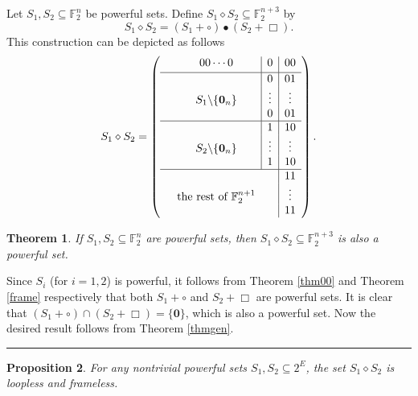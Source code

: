 \documentclass[12pt]{article}
\newtheorem{thm}{Theorem}[section]
\newtheorem{pro}[thm]{Proposition}
\def\pf{\noindent {\it Proof.\ }}
\def\qed{\hfill \rule{4pt}{7pt}}
\begin{document}
Let $S_1,S_2\subseteq\mathbb{F}_2^{n}$ be powerful sets.  Define
$S_1\diamond S_2\subseteq\mathbb{F}_2^{n+3}$ by
\[
S_1\diamond S_2=(S_1+\circ)\bullet(S_2+\Box).
\]
This construction can be depicted as follows
\begin{equation*}
S_1\diamond S_2=\left(
\begin{array}{cccc}
  &00\cdots0 &\multicolumn{1}{|c}{0}  &\multicolumn{1}{|c}{00}\\[2pt] \hline
  &          &\multicolumn{1}{|c}{0}  &\multicolumn{1}{|c}{01}\\
  &S_1\backslash\{\mathbf{0}_n\} &\multicolumn{1}{|c}{\vdots} &\multicolumn{1}{|c}{\vdots}\\
  &          &\multicolumn{1}{|c}{0}  &\multicolumn{1}{|c}{01}\\ \hline
  &          &\multicolumn{1}{|c}{1}  &\multicolumn{1}{|c}{10}\\
  &S_2\backslash\{\mathbf{0}_n\} &\multicolumn{1}{|c}{\vdots} &\multicolumn{1}{|c}{\vdots}\\
  &          &\multicolumn{1}{|c}{1}  &\multicolumn{1}{|c}{10}\\ \hline
  &          &                        &\multicolumn{1}{|c}{11}\\
  &\mbox{the rest of $\mathbb{F}_2^{n+1}$}  &          &\multicolumn{1}{|c}{\vdots}\\
  &          &                        &\multicolumn{1}{|c}{11}\\
\end{array}
\right).
\end{equation*}

\begin{thm}
\label{thm:diamond-powerful}
If $S_1,S_2\subseteq\mathbb{F}_2^{n}$ are powerful sets, then $S_1\diamond S_2\subseteq\mathbb{F}_2^{n+3}$ is also a powerful set.
\end{thm}
\pf
Since $S_i$ (for $i=1,2$) is powerful, it follows from Theorem \ref{thm00} and Theorem \ref{frame} respectively that both $S_1+\circ$ and $S_2+\Box$ are powerful sets.  It is clear that $(S_1+\circ)\cap(S_2+\Box)=\{\mathbf{0}\}$, which is also a powerful set.  Now the desired result follows from Theorem \ref{thmgen}.
\qed

\begin{pro}\label{propn:diamond-loopless-frameless}
For any nontrivial powerful sets $S_1,S_2\subseteq2^E$, the set $S_1 \diamond S_2$ is loopless and frameless.
\end{pro}
\end{document}
